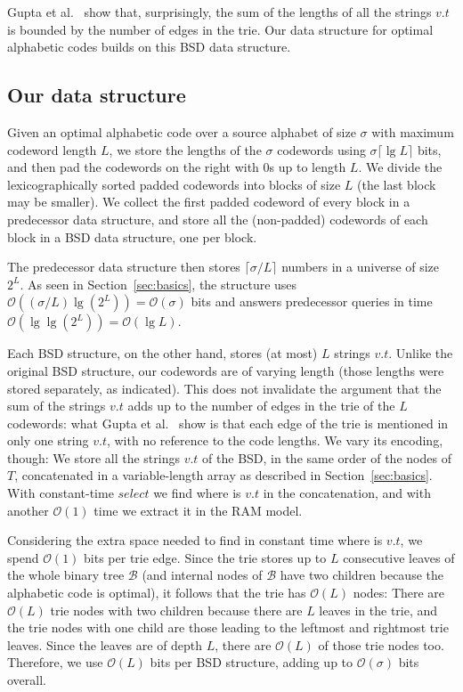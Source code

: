 \documentclass[preprint,12pt]{elsarticle}
\newcommand{\Oh}[1]{\ensuremath{\mathcal{O}\!\left({#1}\right)}}
\newcommand{\B}{\mathcal{B}}
\renewcommand{\log}{\lg}
\begin{document}
Gupta et al.~\cite{GHSV07} show that, surprisingly, the sum of the lengths of 
all the strings $v.t$ is bounded by the number of edges in the trie.
Our data structure for optimal alphabetic codes builds on this BSD data 
structure.

\subsection{Our data structure}

Given an optimal alphabetic code over a source alphabet of size $\sigma$ with 
maximum codeword length $L$, we store the lengths of the $\sigma$ codewords 
using $\sigma\lceil \log L\rceil$ bits, and then pad the codewords on the right
with 0s
up to length $L$.  We divide the lexicographically sorted padded codewords into
blocks of size $L$ (the last block may be smaller). We collect the first padded
codeword of every block in a predecessor data structure, and store all the 
(non-padded) codewords of each block in a BSD data structure, one per block.

The predecessor data structure then stores $\lceil \sigma/L \rceil$ numbers
in a universe of size $2^L$. As seen in Section~\ref{sec:basics}, the structure
uses $\Oh{(\sigma/L)\log(2^L)} = \Oh{\sigma}$ bits and
answers predecessor queries in time $\Oh{\log\log(2^L)} = \Oh{\log L}$.

Each BSD structure, on the other hand, stores (at most) $L$ strings $v.t$.
Unlike the original BSD structure, our codewords are of varying length
(those lengths were stored separately, as indicated). This does not invalidate
the argument that the sum of the strings $v.t$ adds up to the number of edges in
the trie of the $L$ codewords: what Gupta et al.~\cite[Lem.~3]{GHSV07} show
is that each edge of the trie is mentioned in only one string $v.t$, with no
reference to the code lengths. 
We vary its encoding, though: We store all the strings $v.t$ of the BSD, 
in the same order of the nodes of $T$, concatenated in a variable-length array 
as described in Section~\ref{sec:basics}. With constant-time $select$ we find 
where is $v.t$ in the concatenation, and with another $\Oh{1}$ time we extract
it in the RAM model. 

Considering the extra space needed to find in constant time where is $v.t$, we 
spend $\Oh{1}$ bits per trie edge. Since the trie stores up to $L$ consecutive
leaves of the whole binary tree $\B$ (and internal nodes of $\B$ have two
children because the alphabetic code is optimal), it follows that the trie
has $\Oh{L}$ nodes: There are $\Oh{L}$ trie nodes with two children because
there are $L$ leaves in the trie, and the trie nodes with one child are those
leading to the leftmost and rightmost trie leaves. Since the leaves are of 
depth $L$, there are $\Oh{L}$ of those trie nodes too.
Therefore, we use $\Oh{L}$ bits per BSD structure,
adding up to $\Oh{\sigma}$ bits overall. 
\end{document}

